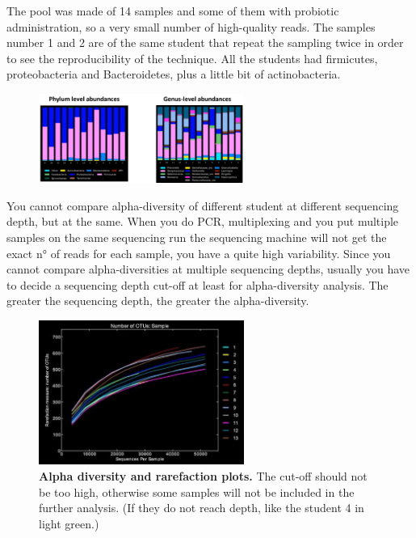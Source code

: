 The pool was made of 14 samples and some of them with probiotic administration, so a very small number of high-quality reads. The samples number 1 and 2 are of the same student that repeat the sampling twice in order to see the reproducibility of the technique.
All the students had firmicutes, proteobacteria and Bacteroidetes, plus a little bit of actinobacteria.

\begin{figure}[h]
\centering
\includegraphics[width=0.6\textwidth]{Level.png}
\caption{}
\end{figure}

You cannot compare alpha-diversity of different student at different sequencing depth, but at the same.
When you do PCR, multiplexing and you put multiple samples on the same sequencing run the sequencing machine
will not get the exact n° of reads for each sample, you have a quite high variability. Since you cannot compare alpha-diversities at multiple sequencing depths, usually you have to decide a sequencing depth cut-off at least for alpha-diversity analysis. The greater the sequencing depth, the greater the alpha-diversity. 

\begin{figure}[h]
\centering
\includegraphics[width=0.6\textwidth]{AlphaDiversity.png}
\caption{\textbf{Alpha diversity and rarefaction plots.} The cut-off should not be too high, otherwise some samples will not be included in the further analysis. (If they do not reach depth, like the student 4 in light green.)}
\end{figure}

